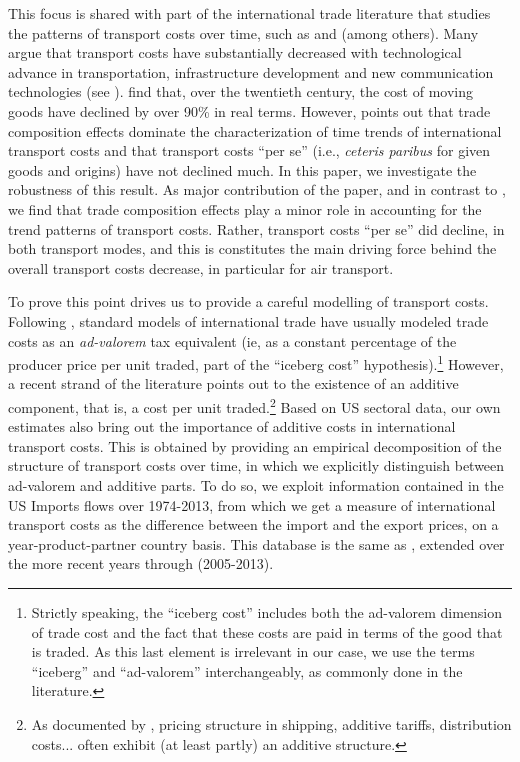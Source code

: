 \documentclass[a4paper,11pt]{article}
\begin{document}
This focus is shared with part of the international trade literature that studies the patterns of transport costs over time, such as \cite{hummels2007} and \cite{Behar_Venables} (among others). Many argue that transport costs have substantially decreased with technological advance in transportation, infrastructure development and new communication technologies (see \citealp{Lafourcade_Thisse}). \cite{Glaeser04} find that, over the twentieth century, the cost of moving goods have declined by over 90\% in real terms. However, \cite{hummels2007} points out that trade composition effects dominate the characterization of time trends of international transport costs and that transport costs ``per se'' (i.e., \textit{ceteris paribus} for given goods and origins) have not declined much. In this paper, we investigate the robustness of this result. As major contribution of the paper, and in contrast to \cite{hummels2007}, we find that trade composition effects play a minor role in accounting for the trend patterns of transport costs. Rather, transport costs ``per se'' did decline, in both transport modes, and this is constitutes the main driving force behind the overall transport costs decrease, in particular for air transport.\medskip

To prove this point drives us to provide a careful modelling of transport costs. Following \citet{samuelson1954}, standard models of international trade have usually modeled trade costs as an \emph{ad-valorem} tax equivalent (ie, as a constant percentage of the producer price per unit traded, part of the ``iceberg cost'' hypothesis).\footnote{Strictly speaking, the ``iceberg cost'' includes both the ad-valorem dimension of trade cost and the fact that these costs are paid in terms of the good that is traded. As this last element is irrelevant in our case, we use the terms ``iceberg'' and ``ad-valorem'' interchangeably, as commonly done in the literature.} However, a recent strand of the literature points out to the existence of an additive component, that is, a cost per unit traded.\footnote{As documented by \cite{Irrazabal_2015}, pricing structure in shipping, additive tariffs, distribution costs... often exhibit (at least partly) an additive structure.} Based on US sectoral data, our own estimates also bring out the importance of additive costs in international transport costs. This is obtained by providing an empirical decomposition of the structure of transport costs over time, in which we explicitly distinguish between ad-valorem and additive parts. To do so, we exploit information contained in the US Imports flows over 1974-2013, from which we get a measure of international transport costs as the difference between the import and the export prices, on a year-product-partner country basis. This database is the same as \cite{hummels2007}, extended over the more recent years through (2005-2013). \smallskip
\end{document}
